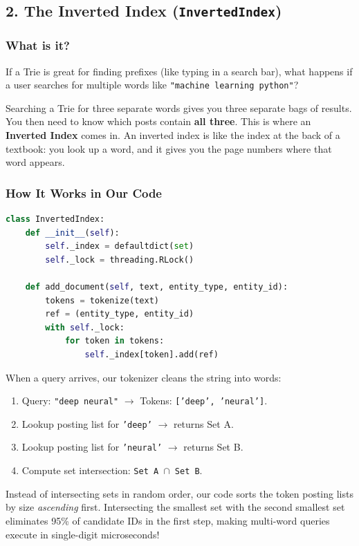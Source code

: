 \documentclass[11pt,a4paper]{article}
\begin{document}
\subsection{2. The Inverted Index (\texttt{InvertedIndex})}

\subsubsection{What is it?}
If a Trie is great for finding prefixes (like typing in a search bar), what happens if a user searches for multiple words like \texttt{"machine learning python"}?

Searching a Trie for three separate words gives you three separate bags of results. You then need to know which posts contain \textbf{all three}. This is where an \textbf{Inverted Index} comes in. An inverted index is like the index at the back of a textbook: you look up a word, and it gives you the page numbers where that word appears.

\subsubsection{How It Works in Our Code}
\begin{lstlisting}[language=Python]
class InvertedIndex:
    def __init__(self):
        self._index = defaultdict(set)
        self._lock = threading.RLock()

    def add_document(self, text, entity_type, entity_id):
        tokens = tokenize(text)
        ref = (entity_type, entity_id)
        with self._lock:
            for token in tokens:
                self._index[token].add(ref)
\end{lstlisting}

When a query arrives, our tokenizer cleans the string into words:
\begin{enumerate}
    \item Query: \texttt{"deep neural"} $\rightarrow$ Tokens: \texttt{['deep', 'neural']}.
    \item Lookup posting list for \texttt{'deep'} $\rightarrow$ returns Set A.
    \item Lookup posting list for \texttt{'neural'} $\rightarrow$ returns Set B.
    \item Compute set intersection: \texttt{Set A $\cap$ Set B}.
\end{enumerate}

\begin{tcolorbox}[colback=teal!5!white,colframe=teal!75!black,title=\textbf{Smart Optimization in Multi-Word Intersections}]
Instead of intersecting sets in random order, our code sorts the token posting lists by size \textit{ascending} first. Intersecting the smallest set with the second smallest set eliminates 95\% of candidate IDs in the first step, making multi-word queries execute in single-digit microseconds!
\end{tcolorbox}
\end{document}
